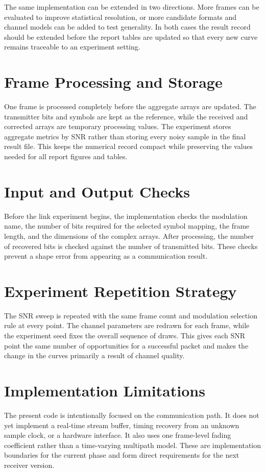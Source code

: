 \documentclass[12pt,twoside,openright]{report}
\begin{document}
The same implementation can be extended in two directions. More frames can
be evaluated to improve statistical resolution, or more candidate formats
and channel models can be added to test generality. In both cases the
result record should be extended before the report tables are updated so
that every new curve remains traceable to an experiment setting.

\section{Frame Processing and Storage}
One frame is processed completely before the aggregate arrays are updated.
The transmitter bits and symbols are kept as the reference, while the
received and corrected arrays are temporary processing values. The
experiment stores aggregate metrics by SNR rather than storing every noisy
sample in the final result file. This keeps the numerical record compact
while preserving the values needed for all report figures and tables.

\section{Input and Output Checks}
Before the link experiment begins, the implementation checks the modulation
name, the number of bits required for the selected symbol mapping, the frame
length, and the dimensions of the complex arrays. After processing, the
number of recovered bits is checked against the number of transmitted bits.
These checks prevent a shape error from appearing as a communication result.

\section{Experiment Repetition Strategy}
The SNR sweep is repeated with the same frame count and modulation selection
rule at every point. The channel parameters are redrawn for each frame,
while the experiment seed fixes the overall sequence of draws. This gives
each SNR point the same number of opportunities for a successful packet and
makes the change in the curves primarily a result of channel quality.

\section{Implementation Limitations}
The present code is intentionally focused on the communication path. It
does not yet implement a real-time stream buffer, timing recovery from an
unknown sample clock, or a hardware interface. It also uses one
frame-level fading coefficient rather than a time-varying multipath model.
These are implementation boundaries for the current phase and form direct
requirements for the next receiver version.
\end{document}
